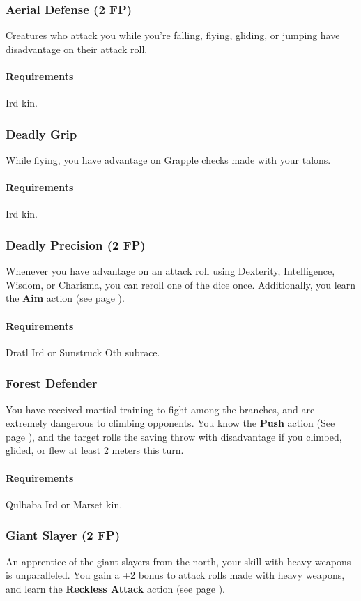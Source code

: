     \subsubsection{Aerial Defense (2 FP)} \label{feat::aerialdefense}
        Creatures who attack you while you're falling, flying, gliding, or jumping have disadvantage on their attack roll.
        \paragraph{Requirements} Ird kin.
    \subsubsection{Deadly Grip} \label{feat::deadlygrip}
        While flying, you have advantage on Grapple checks made with your talons.
        \paragraph{Requirements} Ird kin.
    \subsubsection{Deadly Precision (2 FP)} \label{feat::deadlyprecision}
        Whenever you have advantage on an attack roll using Dexterity, Intelligence, Wisdom, or Charisma, you can reroll one of the dice once.
        Additionally, you learn the \textbf{Aim} action (see page \pageref{act::aim}).
        \paragraph{Requirements} Dratl Ird or Sunstruck Oth subrace.
    \subsubsection{Forest Defender} \label{feat::forestdefender}
        You have received martial training to fight among the branches, and are extremely dangerous to climbing opponents.
        You know the \textbf{Push} action (See page \pageref{act::push}), and the target rolls the saving throw with disadvantage if you climbed, glided, or flew at least 2 meters this turn.
        \paragraph{Requirements} Qulbaba Ird or Marset kin.
    \subsubsection{Giant Slayer (2 FP)} \label{feat::giantslayer}
        An apprentice of the giant slayers from the north, your skill with heavy weapons is unparalleled.
        You gain a +2 bonus to attack rolls made with heavy weapons, and learn the \textbf{Reckless Attack} action (see page \pageref{act::recklessattack}).
